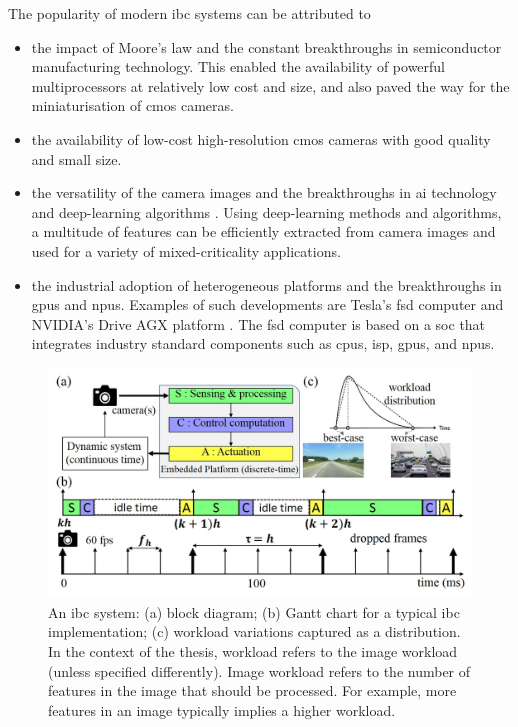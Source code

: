 The popularity of modern \gls{ibc} systems can be attributed to 
\begin{itemize}
    \item the impact of Moore's law \cite{moore1998cramming} and the constant breakthroughs in semiconductor manufacturing technology. This enabled the availability of powerful multiprocessors at relatively low cost and size, and also paved the way for the miniaturisation of \gls{cmos} cameras.
    \item the availability of low-cost high-resolution \gls{cmos} cameras with good quality and small size.
    \item the versatility of the camera images and the breakthroughs in \gls{ai} technology and deep-learning algorithms \cite{lecun2015deep}. Using deep-learning methods and algorithms, a multitude of features can be efficiently extracted from camera images and used for a variety of mixed-criticality applications.  
    \item the industrial adoption of heterogeneous platforms and the breakthroughs in \glspl{gpu} and \glspl{npu}. Examples of such developments are Tesla's \gls{fsd} computer \cite{talpes2020compute} and NVIDIA's Drive AGX platform \cite{nvidiadrive}. 
   The  \gls{fsd} computer is based on a \gls{soc} that integrates industry standard components such as \glspl{cpu}, \gls{isp}, \glspl{gpu}, and \glspl{npu}.
\end{itemize}

\begin{figure}[htb]
\centerline{\includegraphics[width=\textwidth]{01_intro/images/ibc_intro.jpg}}
\vspace{-1ex}
\caption{An \acrfull{ibc} system: (a) block diagram; (b) Gantt chart for a typical \gls{ibc} implementation; (c) workload variations captured as a distribution. In the context of the thesis, workload refers to the image workload (unless specified differently). Image workload refers to the number of features in the image that should be processed. For example, more features in an image typically implies a higher workload.}
\label{fig:ch1_ibc_intro}
\end{figure}

